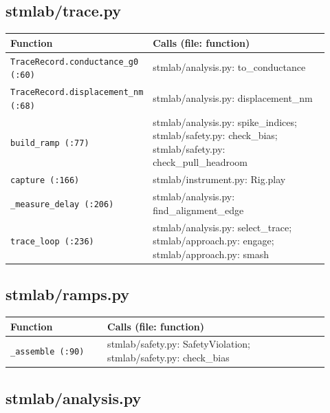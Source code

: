 \subsection{stmlab/trace.py}

\small\setlength{\LTleft}{0pt}\setlength{\LTright}{\fill}
\begin{longtable}{@{}>{\raggedright\arraybackslash}p{0.280\linewidth}>{\raggedright\arraybackslash}p{0.640\linewidth}@{}}
\toprule
\textbf{Function} & \textbf{Calls (file: function)} \\
\midrule\endhead
\texttt{Trace\discretionary{}{}{}Record.\discretionary{}{}{}conductance\_\discretionary{}{}{}g0 (:60)} & stmlab/analysis.py: to\_conductance \\
\texttt{Trace\discretionary{}{}{}Record.\discretionary{}{}{}displacement\_\discretionary{}{}{}nm (:68)} & stmlab/analysis.py: displacement\_nm \\
\texttt{build\_\discretionary{}{}{}ramp (:77)} & stmlab/analysis.py: spike\_indices; stmlab/safety.py: check\_bias; stmlab/safety.py: check\_pull\_headroom \\
\texttt{capture (:166)} & stmlab/instrument.py: Rig.play \\
\texttt{\_\discretionary{}{}{}measure\_\discretionary{}{}{}delay (:206)} & stmlab/analysis.py: find\_alignment\_edge \\
\texttt{trace\_\discretionary{}{}{}loop (:236)} & stmlab/analysis.py: select\_trace; stmlab/approach.py: engage; stmlab/approach.py: smash \\
\bottomrule
\end{longtable}
\normalsize

\subsection{stmlab/ramps.py}

\small\setlength{\LTleft}{0pt}\setlength{\LTright}{\fill}
\begin{longtable}{@{}>{\raggedright\arraybackslash}p{0.280\linewidth}>{\raggedright\arraybackslash}p{0.640\linewidth}@{}}
\toprule
\textbf{Function} & \textbf{Calls (file: function)} \\
\midrule\endhead
\texttt{\_\discretionary{}{}{}assemble (:90)} & stmlab/safety.py: SafetyViolation; stmlab/safety.py: check\_bias \\
\bottomrule
\end{longtable}
\normalsize

\subsection{stmlab/analysis.py}

